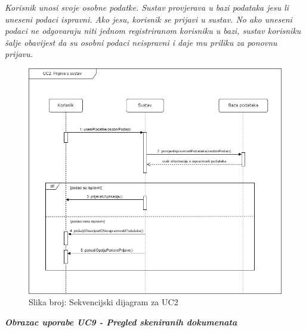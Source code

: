 				\textit{Korisnik unosi svoje osobne podatke. Sustav provjerava u bazi podataka jesu li uneseni podaci ispravni. Ako jesu, korisnik se prijavi u sustav. No ako uneseni podaci ne odgovaraju niti jednom registriranom korisniku u bazi, sustav korisniku šalje obavijest da su osobni podaci neispravni i daje mu priliku za ponovnu prijavu.}
				\begin{figure}[H]
					\includegraphics[width=\textwidth]{slike/sekvencijski_dijagram_UC2.PNG} %
					\caption{Slika broj: Sekvencijski dijagram za UC2}
					\label{fig:UC2} %
				\end{figure}
				\clearpage

				\textbf{\textit{Obrazac uporabe UC9 - Pregled skeniranih dokumenata}}\\
				
